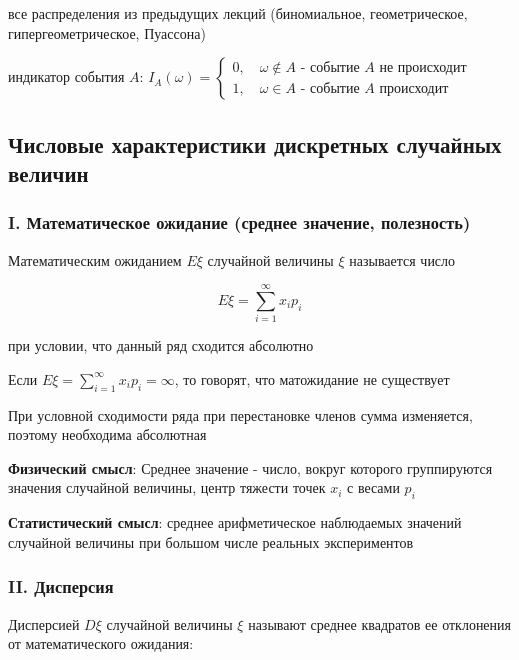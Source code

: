 \documentclass[12pt]{article}
\begin{document}

    \smallvspace

     все распределения из предыдущих лекций (биномиальное, геометрическое, гипергеометрическое, Пуассона)

     индикатор события $A$: $I_A (\omega) = \begin{cases}
                                                        0, \quad \omega \notin A \text{ - событие } A \text{ не происходит} \\ 1, \quad \omega \in A \text{ - событие } A \text{ происходит}
    \end{cases}$

    \subsection{Числовые характеристики дискретных случайных величин}

    \subsubsection{I. Математическое ожидание (среднее значение, полезность)}

    \Defs Математическим ожиданием $E\xi$ случайной величины $\xi$ называется число

    \[ E\xi = \sum_{i = 1}^\infty x_i p_i \]

    при условии, что данный ряд сходится абсолютно

    \Nota Если $E\xi = \sum_{i = 1}^\infty x_i p_i = \infty$, то говорят, что матожидание не существует

    При условной сходимости ряда при перестановке членов сумма изменяется, поэтому необходима абсолютная

    \textbf{Физический смысл}: Среднее значение - число, вокруг которого группируются значения случайной величины, центр тяжести точек $x_i$ с весами $p_i$

    \textbf{Статистический смысл}: среднее арифметическое наблюдаемых значений случайной величины при
    большом числе реальных экспериментов

    \subsubsection{II. Дисперсия}

    \Defs Дисперсией $D\xi$ случайной величины $\xi$ называют среднее квадратов ее отклонения от математического ожидания:
\end{document}
